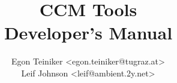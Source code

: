 \documentclass{book}
\author{
  Egon Teiniker <egon.teiniker@tugraz.at>\\
  Leif Johnson <leif@ambient.2y.net>
}
\title{{\Huge CCM Tools}\\Developer's Manual}
\begin{document}
\maketitle
{}
\tableofcontents
\listoffigures

\newpage
{}
\setlength{\parskip}{1em}








\begin{appendix}

\end{appendix}



\end{document}
